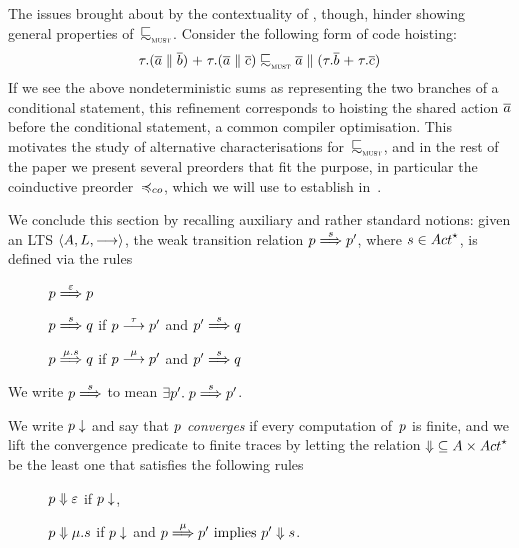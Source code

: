 The issues brought about by the contextuality of ,
though, hinder showing general properties of~$\testleqS$.
Consider the following form of code hoisting:
  \begin{equation}
    \label{eq:mailbox-hoisting}
     \tau.(\co{\aa} \Par \co{b}) \extc
     \tau.(\co{\aa} \Par \co{c}) \testleqS \co{\aa} \Par (\tau.\co{b} \extc
     \tau.\co{c})
  \end{equation}
  If we see the above nondeterministic sums as representing the two
  branches of a conditional statement, this refinement corresponds to
  hoisting the shared action $\overline{a}$ before the conditional
  statement, a common compiler optimisation.
%
This motivates the study of alternative characterisations for~$\testleqS$, and
in the rest of the paper we present several preorders that fit the purpose, in
particular the coinductive preorder~$\coindleq$, which we will use to establish
 in~.


We conclude this section by recalling auxiliary and rather standard
notions: given an LTS $\langle A, L, \mathrel{\overset{}\longrightarrow} \rangle$,
the weak transition relation $\state \wt{ \trace } \stateA $,
where $ \trace \in\Actfin$,
is defined via the rules
\begin{description}
\item[]
  $p \mathrel{\overset{\varepsilon} \Longrightarrow} p$
\item[]
  $p \mathrel{\overset{ s } \Longrightarrow} q$ if $\state\st{\tau}\stateA$
  and $\stateA \wt{ \trace } \stateB$
\item[]
  $p \mathrel{\overset{\mu.s} \Longrightarrow} q$ if $\state \st{\mu} \stateA$
  and $\stateA \wt{\trace} \stateB$
\end{description}
We write $ p \mathrel{\overset{ s } \Longrightarrow}  $ to mean  $\exists \stateA \suchthat \state
\wt{ \trace } \stateA$.



\renewcommand{\stateA}{p'}
We write $p \downarrow$ and say that {\em $p$ converges} if every
computation of~$p$ is finite, and we lift the convergence predicate
to finite traces by letting the relation
${\cnvalong} \subseteq \States \times \Actfin$ be the least one that
satisfies the following rules%
\begin{description}
\item[\cnvepsilon] $p \mathrel{\Downarrow} \varepsilon$ if $p \downarrow$,
\item[\cnvmu] $ p \mathrel{\Downarrow} \mu.s $ if $p \downarrow$ and
  $\state \wt{\mu} \stateA \implies \stateA \cnvalong \trace$.
\end{description}



